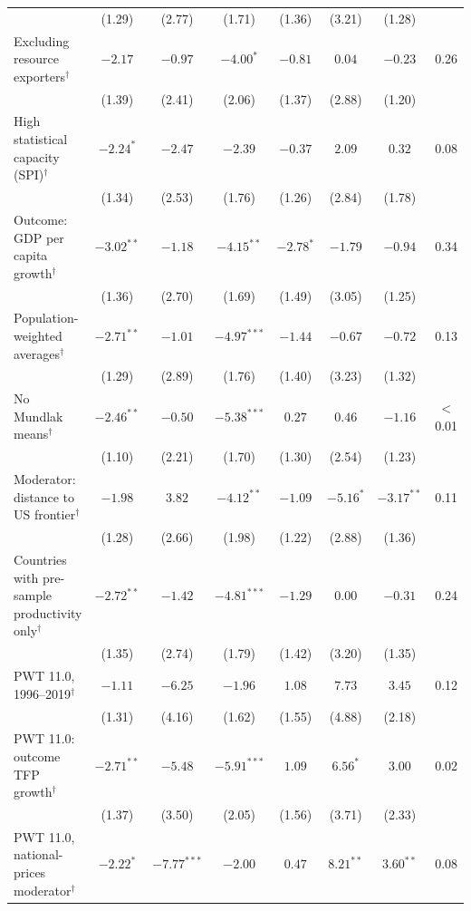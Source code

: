 \documentclass[preprint,12pt,authoryear]{elsarticle}
\begin{document}
\begin{table}[!p]
\begin{threeparttable}
\begin{tabular}{lccccccc}
 & (1.29) & (2.77) & (1.71) & (1.36) & (3.21) & (1.28) & \\
\quad Excluding resource exporters$^{\dagger}$ & $-2.17$ & $-0.97$ & $-4.00^{*}$ & $-0.81$ & $0.04$ & $-0.23$ & 0.26\\
 & (1.39) & (2.41) & (2.06) & (1.37) & (2.88) & (1.20) & \\
\quad High statistical capacity (SPI)$^{\dagger}$ & $-2.24^{*}$ & $-2.47$ & $-2.39$ & $-0.37$ & $2.09$ & $0.32$ & 0.08\\
 & (1.34) & (2.53) & (1.76) & (1.26) & (2.84) & (1.78) & \\
\quad Outcome: GDP per capita growth$^{\dagger}$ & $-3.02^{**}$ & $-1.18$ & $-4.15^{**}$ & $-2.78^{*}$ & $-1.79$ & $-0.94$ & 0.34\\
 & (1.36) & (2.70) & (1.69) & (1.49) & (3.05) & (1.25) & \\
\quad Population-weighted averages$^{\dagger}$ & $-2.71^{**}$ & $-1.01$ & $-4.97^{***}$ & $-1.44$ & $-0.67$ & $-0.72$ & 0.13\\
 & (1.29) & (2.89) & (1.76) & (1.40) & (3.23) & (1.32) & \\
\quad No Mundlak means$^{\dagger}$ & $-2.46^{**}$ & $-0.50$ & $-5.38^{***}$ & $0.27$ & $0.46$ & $-1.16$ & $<$0.01\\
 & (1.10) & (2.21) & (1.70) & (1.30) & (2.54) & (1.23) & \\
\quad Moderator: distance to US frontier$^{\dagger}$ & $-1.98$ & $3.82$ & $-4.12^{**}$ & $-1.09$ & $-5.16^{*}$ & $-3.17^{**}$ & 0.11\\
 & (1.28) & (2.66) & (1.98) & (1.22) & (2.88) & (1.36) & \\
\quad Countries with pre-sample productivity only$^{\dagger}$ & $-2.72^{**}$ & $-1.42$ & $-4.81^{***}$ & $-1.29$ & $0.00$ & $-0.31$ & 0.24\\
 & (1.35) & (2.74) & (1.79) & (1.42) & (3.20) & (1.35) & \\
\quad PWT 11.0, 1996--2019$^{\dagger}$ & $-1.11$ & $-6.25$ & $-1.96$ & $1.08$ & $7.73$ & $3.45$ & 0.12\\
 & (1.31) & (4.16) & (1.62) & (1.55) & (4.88) & (2.18) & \\
\quad PWT 11.0: outcome TFP growth$^{\dagger}$ & $-2.71^{**}$ & $-5.48$ & $-5.91^{***}$ & $1.09$ & $6.56^{*}$ & $3.00$ & 0.02\\
 & (1.37) & (3.50) & (2.05) & (1.56) & (3.71) & (2.33) & \\
\quad PWT 11.0, national-prices moderator$^{\dagger}$ & $-2.22^{*}$ & $-7.77^{***}$ & $-2.00$ & $0.47$ & $8.21^{**}$ & $3.60^{**}$ & 0.08\\

\end{tabular}
\end{threeparttable}
\end{table}
\end{document}
